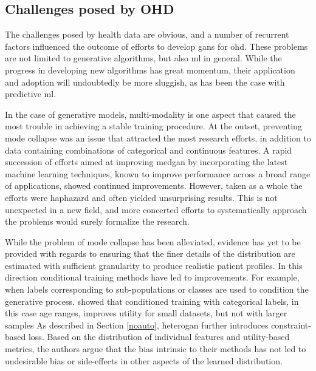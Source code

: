 \subsection{Challenges posed by OHD}
The challenges posed by health data are obvious, and a number of recurrent factors influenced the outcome of efforts to develop \glspl{gan} for \gls{ohd}. These problems are not limited to generative algorithms, but also \gls{ml} in general. While the progress in developing new algorithms has great momentum, their application and adoption will undoubtedly be more sluggish, as has been the case with predictive \gls{ml}.\par

In the case of generative models, multi-modality is one aspect that caused the most trouble in achieving a stable training procedure. At the outset, preventing mode collapse was an issue that attracted the most research efforts, in addition to data containing combinations of categorical and continuous features. A rapid succession of efforts aimed at improving \gls{medgan} by incorporating the latest machine learning techniques, known to improve performance across a broad range of applications, showed continued improvements. However, taken as a whole the efforts were haphazard and often yielded unsurprising results. This is not unexpected in a new field, and more concerted efforts to systematically approach the problems would surely formalize the research.\par

While the problem of mode collapse has been alleviated, evidence has yet to be provided with regards to ensuring that the finer details of the distribution are estimated with sufficient granularity to produce realistic patient profiles. In this direction conditional training methods have led to improvements. For example, when labels corresponding to sub-populations or classes are used to condition the generative process. \citeauthor{Zhang2020} showed that conditioned training with categorical labels, in this case age ranges, improves utility for small datasets, but not with larger samples \cite{Zhang2020} As described in Section \ref{noauto}, \gls{heterogan} further introduces constraint-based loss. Based on the distribution of individual features and utility-based metrics, the authors argue that the bias intrinsic to their methods has not led to undesirable bias or side-effects in other aspects of the learned distribution. 

